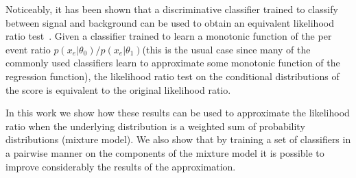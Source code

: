 \documentclass[a4paper]{jpconf}
\begin{document}
Noticeably, it has been shown that a discriminative classifier trained to classify between signal and background can be used to obtain an equivalent likelihood ratio test~\cite{Cranmer2015}. Given a classifier trained to learn a monotonic function of the per event ratio $p(x_e | \theta_0) / p(x_e | \theta_1)$(this is the usual case since many of the commonly used classifiers learn to approximate some monotonic function of the regression function), the likelihood ratio test on the conditional distributions of the score is equivalent to the original likelihood ratio.

In this work we show how these results can be used to approximate the likelihood ratio when the underlying distribution is a weighted sum of probability distributions (mixture model). %
We also show that by training a set of classifiers in a pairwise manner on the components of the mixture model it is possible to improve considerably the results of the approximation. %


\end{document}
